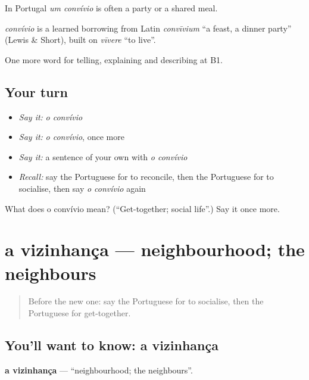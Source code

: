 In Portugal \emph{um convívio} is often a party or a shared meal.

\begin{cousinweb}
\emph{convívio} is a learned borrowing from Latin \emph{convīvium} \textquotedblleft{}a feast, a dinner party\textquotedblright{} (Lewis \& Short), built on \emph{vīvere} \textquotedblleft{}to live\textquotedblright{}.
\end{cousinweb}

\begin{grammarlens}[title={What you've built}]
One more word for telling, explaining and describing at B1.
\end{grammarlens}

\subsection*{Your turn}
\begin{itemize}
\raggedright
  \item \emph{Say it:} \emph{o convívio}
  \item \emph{Say it:} \emph{o convívio}, once more
  \item \emph{Say it:} a sentence of your own with \emph{o convívio}
  \item \emph{Recall:} say the Portuguese for to reconcile, then the Portuguese for to socialise, then say \emph{o convívio} again
\end{itemize}

\begin{tcolorbox}[breakable,colback=teal!4,colframe=teal!35!black,title={Before you move on}]
What does o convívio mean? (\textquotedblleft{}Get-together; social life\textquotedblright{}.) Say it once more.
\end{tcolorbox}
\section[a vizinhança]{a vizinhança — neighbourhood; the neighbours}

\label{lesson:PT-C498-vizinhanca}



\begin{quote}
Before the new one: say the Portuguese for to socialise, then the Portuguese for get-together.
\end{quote}

\subsection*{You'll want to know: a vizinhança}
\textbf{a vizinhança} — \textquotedblleft{}neighbourhood; the neighbours\textquotedblright{}.

